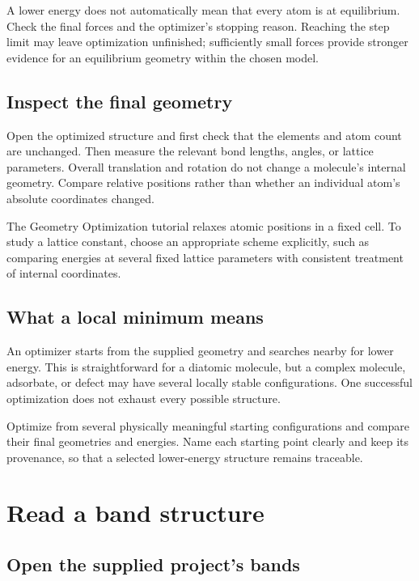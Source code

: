 A lower energy does not automatically mean that every atom is at equilibrium. Check the final forces and the optimizer's stopping reason. Reaching the step limit may leave optimization unfinished; sufficiently small forces provide stronger evidence for an equilibrium geometry within the chosen model.

\subsection{Inspect the final geometry}

Open the optimized structure and first check that the elements and atom count are unchanged. Then measure the relevant bond lengths, angles, or lattice parameters. Overall translation and rotation do not change a molecule's internal geometry. Compare relative positions rather than whether an individual atom's absolute coordinates changed.

The Geometry Optimization tutorial relaxes atomic positions in a fixed cell. To study a lattice constant, choose an appropriate scheme explicitly, such as comparing energies at several fixed lattice parameters with consistent treatment of internal coordinates.

\subsection{What a local minimum means}

An optimizer starts from the supplied geometry and searches nearby for lower energy. This is straightforward for a diatomic molecule, but a complex molecule, adsorbate, or defect may have several locally stable configurations. One successful optimization does not exhaust every possible structure.

Optimize from several physically meaningful starting configurations and compare their final geometries and energies. Name each starting point clearly and keep its provenance, so that a selected lower-energy structure remains traceable.

\section{Read a band structure}

\subsection{Open the supplied project's bands}

